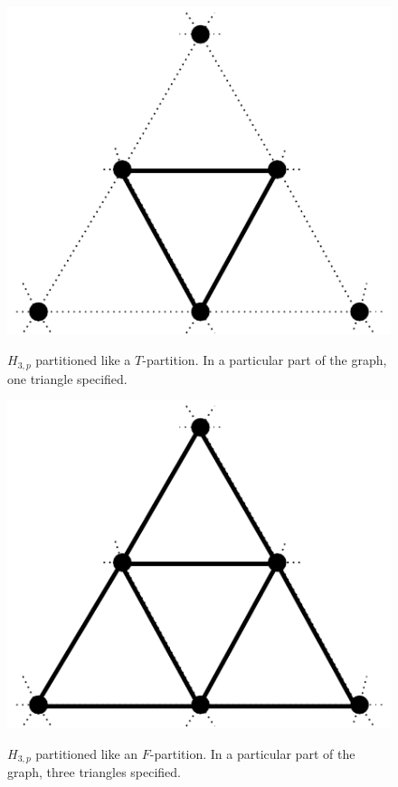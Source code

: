 \documentclass[runningheads,a4paper]{llncs}
\begin{document}
\begin{figure}
\begin{minipage}{0.5\linewidth}
\centering
\includegraphics[scale=0.5]{Tpartition.pdf}
\label{fig:tpart}
\caption{$H_{3,p}$ partitioned like a $T$-partition. In a particular part of the graph, one triangle specified.}
\end{minipage}
\hfill
\begin{minipage}{0.5\linewidth}
\centering
\label{fig:fpart}
\includegraphics[scale=0.5]{Fpartition.pdf}
\caption{$H_{3,p}$ partitioned like an $F$-partition. In a particular part of the graph, three triangles specified.}
\end{minipage}
\end{figure}
\end{document}
